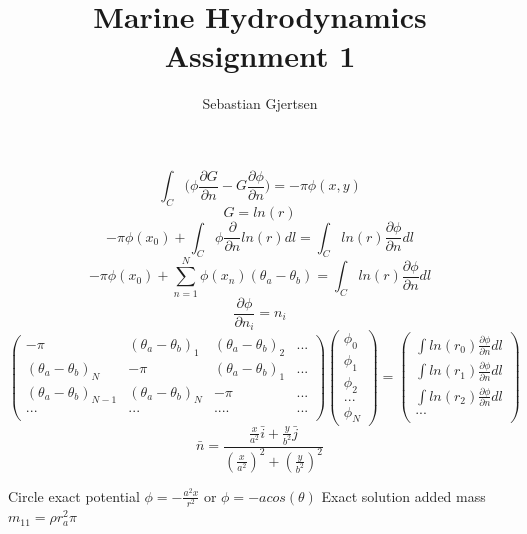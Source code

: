 \documentclass[a4paper,norsk]{article}
\begin{document}
\title{Marine Hydrodynamics \\ Assignment 1}
\author{Sebastian Gjertsen}

\maketitle
\[   \int_C \big(\phi \frac{\partial G }{\partial n} - G\frac{\partial \phi }{\partial n}\big) = -\pi \phi(x,y) \]
\newline
$$ G = ln (r)$$
\newline
$$ -\pi \phi(x_0) + \int_C \phi \frac{\partial }{\partial n} ln(r) dl = \int_C ln(r) \frac{\partial \phi}{\partial n} dl       $$
\newline
\[ -\pi \phi(x_0) + \sum_{n=1}^N \phi(x_n) (\theta_a - \theta_b)  = \int_C ln(r)\frac{\partial \phi }{\partial n} dl    \]
\newline
$$\frac{\partial \phi}{\partial n_i} =n_i $$
\newline
$$
\begin{pmatrix}
  -\pi & (\theta_a - \theta_b)_1  & (\theta_a - \theta_b)_2 & ...\\
  (\theta_a - \theta_b)_N  & -\pi & (\theta_a - \theta_b)_1  & ...\\
  (\theta_a - \theta_b)_{N-1}  & (\theta_a - \theta_b)_N  & -\pi & ...\\
  ... & ... & ....& ...  \\
 \end{pmatrix}
 \begin{pmatrix}
\phi_0  \\
\phi_1 \\
\phi_2 \\ 
  ...  \\
  \phi_N
 \end{pmatrix}
 =
 \begin{pmatrix}
\int ln(r_0)\frac{\partial \phi }{\partial n} dl   \\
\int ln(r_1)\frac{\partial \phi }{\partial n} dl  \\
\int ln(r_2)\frac{\partial \phi }{\partial n} dl  \\ 
  ...  \\
  \end{pmatrix}
  $$
\newline
$$\bar{n} = \frac{\frac{x}{a^2}\bar{i} + \frac{y}{b^2}\bar{j} } { (\frac{x}{a^2})^2 + (\frac{y}{b^2})^2 }$$

\begin{flushleft}
Circle exact potential $\phi =-\frac{a^2x}{r^2} $ or $\phi = -a cos(\theta)$ 
\newline
\newline
Exact solution added mass $m_{11} = \rho r_a^2 \pi $
\end{flushleft}
\end{document}
